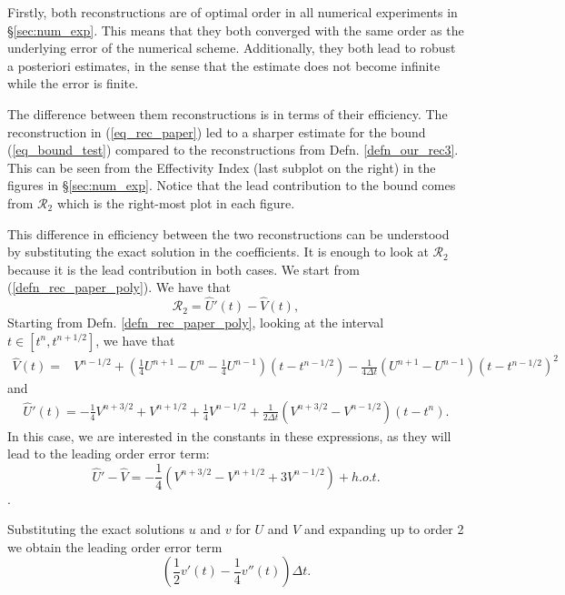 \documentclass[12pt,a4paper]{article}
\numberwithin{equation}{section}
\theoremstyle{definition}
\newcommand{\qp}[1]{\left(#1\right)}
\newcommand{\qb}[1]{\left[#1\right]}
\newcommand{\rec}[1]{\widehat{{#1}}}
\begin{document}
Firstly,  both reconstructions are of optimal order in all numerical experiments in \S \ref{sec:num_exp}. This means that they both converged with the same order as the underlying error of the numerical scheme.  
Additionally, they both lead to robust a posteriori estimates, in the sense that the estimate does not become infinite while the error is finite.

The difference between them reconstructions is in terms of their efficiency.  The reconstruction in (\ref{eq_rec_paper}) led to a sharper estimate for the bound (\ref{eq_bound_test}) compared to the reconstructions from Defn.  \ref{defn_our_rec3}.  This can be seen from the Effectivity Index (last subplot on the right) in the figures in \S\ref{sec:num_exp}.  Notice that the lead contribution to the bound comes from $\mathcal{R}_2$ which is the right-most plot in each figure.

This difference in efficiency between the two reconstructions can be understood by substituting the exact solution in the coefficients.  It is enough to look at $\mathcal{R}_2$ because it is the lead contribution in both cases.  We start  from (\ref{defn_rec_paper_poly}).  We have that 
\begin{equation}
\mathcal{R}_2 = \rec{U}'\qp{t}- \rec{V}\qp{t},
\end{equation}
Starting from Defn. \ref{defn_rec_paper_poly}, looking at the interval $t\in\qb{t^{n}, t^{n+1/2}}$, we have that
\begin{equation*}
\begin{aligned}
\rec{V}\qp{t}=	& V^{n-1/2}
+\qp{\frac{1}{4}U^{n+1}-U^n-\frac{1}{4}U^{n-1}}\qp{t-t^{n-1/2}}
-\frac{1}{4\Delta t}\qp{U^{n+1}-U^{n-1}}\qp{t-t^{n-1/2}}^2
\end{aligned}
\end{equation*}
and 
\begin{equation*}
\begin{aligned}
\rec{U}'\qp{t}=	-\frac{1}{4}V^{n+3/2}+V^{n+1/2}+\frac{1}{4}V^{n-1/2}
+\frac{1}{2\Delta t}\qp{V^{n+3/2}-V^{n-1/2}}\qp{t-t^{n}}.
\end{aligned}
\end{equation*}
In this case, we are interested in the constants in these expressions, as they will lead to the leading order error term:
\begin{equation*}
\rec{U}'-\rec{V} = -\frac{1}{4}\qp{V^{n+3/2}-V^{n+1/2}+3V^{n-1/2}} + h.o.t.
\end{equation*}.

Substituting the exact solutions $u$ and $v$ for $U$ and $V$ and expanding up to order 2 we obtain the  leading order error term 
\begin{equation}
\qp{\frac{1}{2}v'\qp{t}-\frac{1}{4}v''\qp{t}}\Delta t.
\end{equation}
\end{document}
